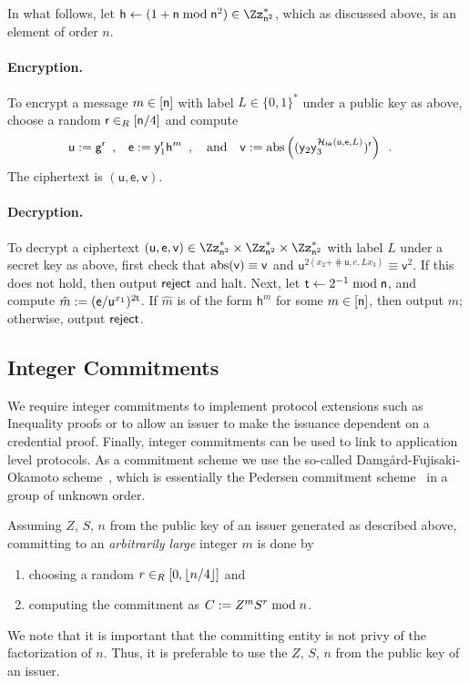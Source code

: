 In what follows, let $\mathsf{h} \asn (1 + \mathsf{n} \bmod \mathsf{n}^2) \in
\Zs{\mathsf{n}^2}$, which as discussed above, is an element of order $n$.

\paragraph{Encryption.}
To encrypt a message $m \in [\mathsf{n}]$ with label $L \in \{0,1\}^*$
under a public key as above, 
choose a
random $\mathsf{r}\in_R [\mathsf{n}/4]$ and compute\\[-3ex]
\begin{align*}
\mathsf{u} &:= \mathsf{g}^\mathsf{r}\enspace, &
\mathsf{e} &:= \mathsf{y}_1^\mathsf{r} \mathsf{h}^m\enspace, \quad \text{and}&
\mathsf{v} &:= \mathop{\mathrm{abs}}\left( (\mathsf{y}_2 \mathsf{y}_3^{\mathcal{H}_{\mathsf{hk}}(\mathsf{u},\mathsf{e},L)})^\mathsf{r} \right)\enspace.
\end{align*}
The ciphertext is $(\mathsf{u},\mathsf{e},\mathsf{v})$.

\paragraph{Decryption.}
To decrypt a ciphertext  $(\mathsf{u},\mathsf{e},\mathsf{v}) \in \Zs{\mathsf{n}^2} \times \Zs{\mathsf{n}^2} \times \Zs{\mathsf{n}^2}$
with label $L$
under a secret key as above,
first check that $\mathop{\mathrm{abs}}(\mathsf{v}) \equiv \mathsf{v}$ and $\mathsf{u}^{2(x_2+
\hash{\mathsf{u},e,L} x_3)} \equiv \mathsf{v}^2$.
If this does not hold, then output $\mathsf{reject}$ and halt.
Next, let $\mathsf{t} \gets 2^{-1} \bmod \mathsf{n}$,
and
compute $\hat{m} := (\mathsf{e}/\mathsf{u}^{x_1})^{2\mathsf{t}}$.
If $\hat{m}$ is of the form $\mathsf{h}^m$ for some $m \in [\mathsf{n}]$,
then output $m$; otherwise, output $\mathsf{reject}$.


\subsection{Integer Commitments} 
\label{sec:commitments}

We require integer commitments to implement protocol extensions such as Inequality
proofs or to allow an issuer to make the issuance dependent on a credential
proof. 
Finally, integer commitments can be used to link to application level protocols.  
As a commitment scheme we use the so-called Damg{\aa}rd-Fujisaki-Okamoto
scheme~\cite{damfuj02}, which is essentially the Pedersen commitment scheme~\cite{peders91b}
in a group of unknown order.

Assuming $Z$, $S$, $n$ from the public key of an issuer generated as described
above, committing to an \emph{arbitrarily large} integer $m$ is done by
\begin{enumerate}
  \item choosing a random  $r \in_R [0,\lfloor{n}/4\rfloor]$ and
  \item computing the commitment as  $C := Z^{m} S^r \bmod{n}$. 
\end{enumerate}
We note that it is important that the committing entity is not privy of the
factorization of $n$.  
Thus, it is preferable to use the $Z$, $S$, $n$ from the public key of an issuer.
